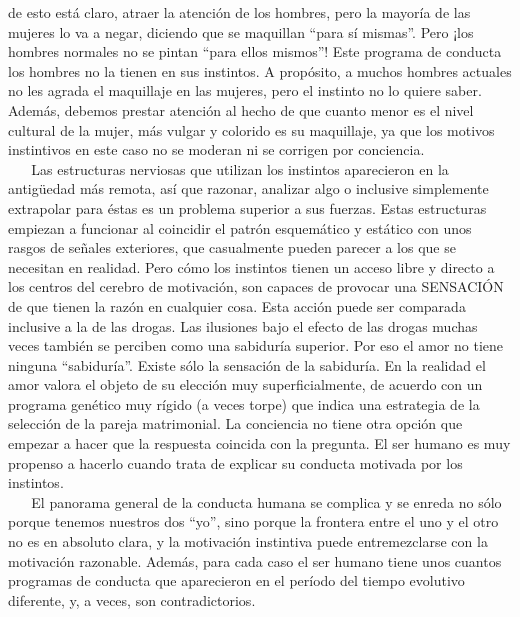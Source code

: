 de esto está claro, atraer la atención de los hombres, pero la mayoría
de las mujeres lo va a negar, diciendo que se maquillan ``para sí
mismas''. Pero ¡los hombres normales no se pintan ``para ellos mismos''!
Este programa de conducta los hombres no la tienen en sus instintos. A
propósito, a muchos hombres actuales no les agrada el maquillaje en las
mujeres, pero el instinto no lo quiere saber. Además, debemos prestar
atención al hecho de que cuanto menor es el nivel cultural de la mujer,
más vulgar y colorido es su maquillaje, ya que los motivos instintivos
en este caso no se moderan ni se corrigen por conciencia.\\
\hspace*{0.333em} ~ ~ Las estructuras nerviosas que utilizan los
instintos aparecieron en la antigüedad más remota, así que razonar,
analizar algo o inclusive simplemente extrapolar para éstas es un
problema superior a sus fuerzas. Estas estructuras empiezan a funcionar
al coincidir el patrón esquemático y estático con unos rasgos de señales
exteriores, que casualmente pueden parecer a los que se necesitan en
realidad. Pero cómo los instintos tienen un acceso libre y directo a los
centros del cerebro de motivación, son capaces de provocar una SENSACIÓN
de que tienen la razón en cualquier cosa. Esta acción puede ser
comparada inclusive a la de las drogas. Las ilusiones bajo el efecto de
las drogas muchas veces también se perciben como una sabiduría superior.
Por eso el amor no tiene ninguna ``sabiduría''. Existe sólo la sensación
de la sabiduría. En la realidad el amor valora el objeto de su elección
muy superficialmente, de acuerdo con un programa genético muy rígido (a
veces torpe) que indica una estrategia de la selección de la pareja
matrimonial. La conciencia no tiene otra opción que empezar a hacer que
la respuesta coincida con la pregunta. El ser humano es muy propenso a
hacerlo cuando trata de explicar su conducta motivada por los
instintos.\\
\hspace*{0.333em} ~ ~ El panorama general de la conducta humana se
complica y se enreda no sólo porque tenemos nuestros dos ``yo'', sino
porque la frontera entre el uno y el otro no es en absoluto clara, y la
motivación instintiva puede entremezclarse con la motivación razonable.
Además, para cada caso el ser humano tiene unos cuantos programas de
conducta que aparecieron en el período del tiempo evolutivo diferente,
y, a veces, son contradictorios.

